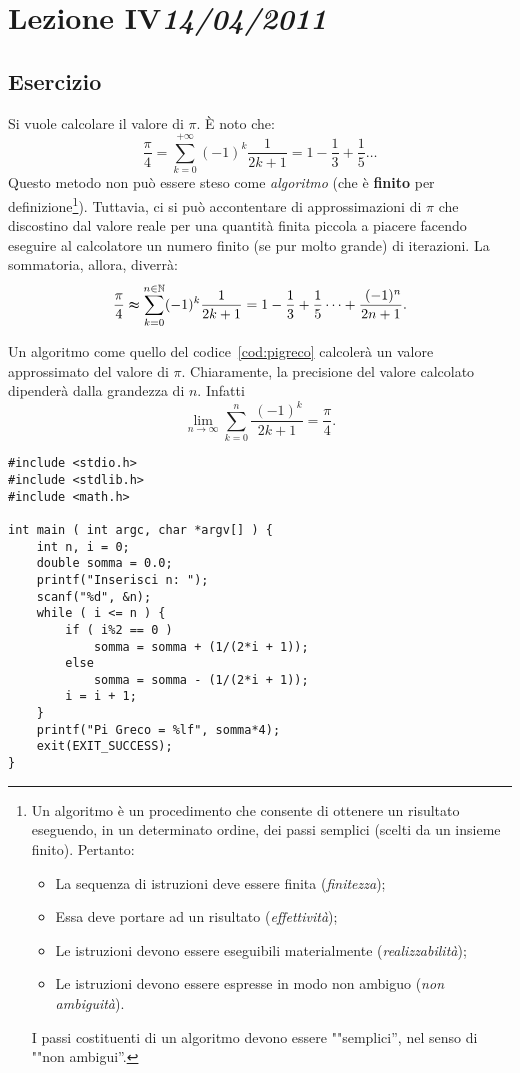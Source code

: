 \chapter[Lezione IV]{Lezione IV\newline\small{\emph{14/04/2011}}}
	\section{Esercizio}
Si vuole calcolare il valore di $\pi$. \`E noto che:
\[
\frac{\pi}{4}=\sum_{k=0}^{+\infty}(-1)^k\frac{1}{2k+1}=1-\frac{1}{3}+\frac{1}{5}\dots
\]
Questo metodo non può essere steso come \emph{algoritmo} (che è \textbf{finito} per definizione\footnote{Un algoritmo è un procedimento che consente di ottenere un risultato eseguendo, in un determinato ordine, dei passi semplici (scelti da un insieme finito). Pertanto:
\begin{itemize}[noitemsep]
	\item
La sequenza di istruzioni deve essere finita (\emph{finitezza});
	\item
Essa deve portare ad un risultato (\emph{effettività});
	\item
Le istruzioni devono essere eseguibili materialmente (\emph{realizzabilità});
	\item
Le istruzioni devono essere espresse in modo non ambiguo (\emph{non ambiguità}).
\end{itemize}   
I passi costituenti di un algoritmo devono essere ""semplici'', nel senso di ""non ambigui''.}). Tuttavia, ci si può accontentare di approssimazioni di $\pi$ che discostino dal valore reale per una quantità finita piccola a piacere facendo eseguire al calcolatore un numero finito (se pur molto grande) di iterazioni. La sommatoria, allora, diverrà:
\[
\frac{\pi}{4} \thickapprox \sum_{k=0}^{n\in\mathbb{N}}(-1)^k\frac{1}{2k+1}=1-\frac{1}{3}+\frac{1}{5}\dots+\frac{\ (-1)^n}{2n+1}.
\]

Un algoritmo come quello del codice~\vref{cod:pigreco} calcolerà un valore approssimato del valore di $\pi$. Chiaramente, la precisione del valore calcolato dipenderà dalla grandezza di $n$. Infatti
\[
\lim_{n\to\infty}\sum_{k=0}^n\frac{\ (-1)^k}{2k+1} =\frac{\pi}{4}.
\]
\begin{lstlisting}[caption={\em Calcolo del valore approssimato di $\pi$.}, label={cod:pigreco}]
#include <stdio.h>
#include <stdlib.h>
#include <math.h>

int main ( int argc, char *argv[] ) {
	int n, i = 0;
	double somma = 0.0;
	printf("Inserisci n: ");
	scanf("%d", &n);
	while ( i <= n ) {
		if ( i%2 == 0 )
			somma = somma + (1/(2*i + 1));
		else
			somma = somma - (1/(2*i + 1));
		i = i + 1;
	}
	printf("Pi Greco = %lf", somma*4);
	exit(EXIT_SUCCESS);
}
\end{lstlisting}
